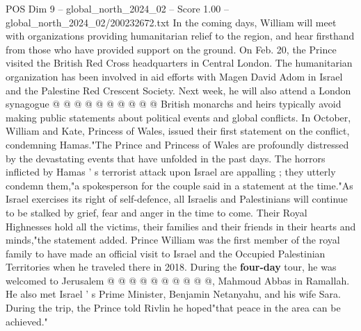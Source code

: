 \begin{textsample}{POS Dim 9 – global\_north\_2024\_02 – Score 1.00 – global\_north\_2024\_02/200232672.txt}
In the coming days, William will meet with organizations providing humanitarian relief to the region, and hear firsthand from those who have provided support on the ground.
On Feb. 20, the Prince visited the British Red Cross headquarters in Central London.
The humanitarian organization has been involved in aid efforts with Magen David Adom in Israel and the Palestine Red Crescent Society.
Next week, he will also attend a London synagogue @ @ @ @ @ @ @ @ @ @ British monarchs and heirs typically avoid making public statements about political events and global conflicts.
In October, William and Kate, Princess of Wales, issued their first statement on the conflict, condemning Hamas."The Prince and Princess of Wales are profoundly distressed by the devastating events that have unfolded in the past days.
The horrors inflicted by Hamas ' s terrorist attack upon Israel are appalling ; they utterly condemn them,"a spokesperson for the couple said in a statement at the time."As Israel exercises its right of self-defence, all Israelis and Palestinians will continue to be stalked by grief, fear and anger in the time to come.
Their Royal Highnesses hold all the victims, their families and their friends in their hearts and minds,"the statement added.
Prince William was the first member of the royal family to have made an official visit to Israel and the Occupied Palestinian Territories when he traveled there in 2018.
During the \textbf{four-day} tour, he was welcomed to Jerusalem @ @ @ @ @ @ @ @ @ @, Mahmoud Abbas in Ramallah.
He also met Israel ' s Prime Minister, Benjamin Netanyahu, and his wife Sara.
During the trip, the Prince told Rivlin he hoped"that peace in the area can be achieved."

\end{textsample}
